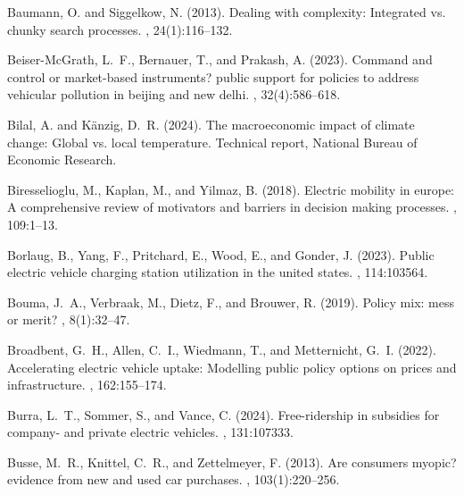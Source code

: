 \documentclass[12pt]{article}
\begin{document}
\begin{thebibliography}{}
Baumann, O. and Siggelkow, N. (2013).
\newblock Dealing with complexity: Integrated vs. chunky search processes.
, 24(1):116--132.

Beiser-McGrath, L.~F., Bernauer, T., and Prakash, A. (2023).
\newblock Command and control or market-based instruments? public support for
  policies to address vehicular pollution in beijing and new delhi.
, 32(4):586--618.

Bilal, A. and K{\"a}nzig, D.~R. (2024).
\newblock The macroeconomic impact of climate change: Global vs. local
  temperature.
\newblock Technical report, National Bureau of Economic Research.

Biresselioglu, M., Kaplan, M., and Yilmaz, B. (2018).
\newblock Electric mobility in europe: A comprehensive review of motivators and
  barriers in decision making processes.
, 109:1--13.

Borlaug, B., Yang, F., Pritchard, E., Wood, E., and Gonder, J. (2023).
\newblock Public electric vehicle charging station utilization in the united
  states.
,
  114:103564.

Bouma, J.~A., Verbraak, M., Dietz, F., and Brouwer, R. (2019).
\newblock Policy mix: mess or merit?
, 8(1):32--47.

Broadbent, G.~H., Allen, C.~I., Wiedmann, T., and Metternicht, G.~I. (2022).
\newblock Accelerating electric vehicle uptake: Modelling public policy options
  on prices and infrastructure.
,
  162:155--174.

Burra, L.~T., Sommer, S., and Vance, C. (2024).
\newblock Free-ridership in subsidies for company- and private electric
  vehicles.
, 131:107333.

Busse, M.~R., Knittel, C.~R., and Zettelmeyer, F. (2013).
\newblock Are consumers myopic? evidence from new and used car purchases.
, 103(1):220--256.


\end{thebibliography}
\end{document}
